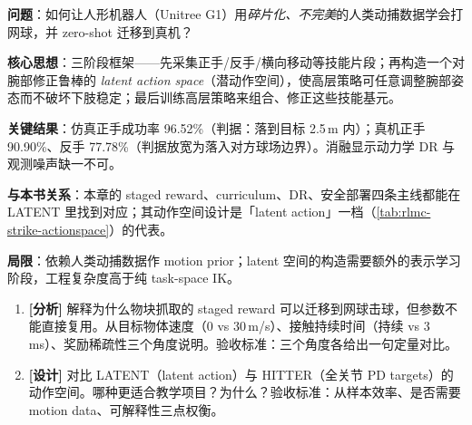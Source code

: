\begin{paper}\label{paper:rlmc-strike-latent}
\textbf{问题}：如何让人形机器人（Unitree G1）用\emph{碎片化、不完美}的人类动捕数据学会打网球，并 zero-shot 迁移到真机？

\textbf{核心思想}：三阶段框架——先采集正手/反手/横向移动等技能片段；再构造一个对腕部修正鲁棒的 \emph{latent action space}（潜动作空间），使高层策略可任意调整腕部姿态而不破坏下肢稳定；最后训练高层策略来组合、修正这些技能基元。

\textbf{关键结果}：仿真正手成功率 96.52\%（判据：落到目标 2.5\,m 内）；真机正手 90.90\%、反手 77.78\%（判据放宽为落入对方球场边界）。消融显示动力学 DR 与观测噪声缺一不可。

\textbf{与本书关系}：本章的 staged reward、curriculum、DR、安全部署四条主线都能在 LATENT 里找到对应；其动作空间设计是「latent action」一档（\cref{tab:rlmc-strike-actionspace}）的代表。

\textbf{局限}：依赖人类动捕数据作 motion prior；latent 空间的构造需要额外的表示学习阶段，工程复杂度高于纯 task-space IK。
\end{paper}


\begin{practice}[本节动手任务]
\begin{enumerate}
  \item \textbf{[分析]} 解释为什么物块抓取的 staged reward 可以迁移到网球击球，但参数不能直接复用。从目标物体速度（0 vs 30\,m/s）、接触持续时间（持续 vs 3\,ms）、奖励稀疏性三个角度说明。验收标准：三个角度各给出一句定量对比。
  \item \textbf{[设计]} 对比 LATENT（latent action）与 HITTER（全关节 PD targets）的动作空间。哪种更适合教学项目？为什么？验收标准：从样本效率、是否需要 motion data、可解释性三点权衡。
\end{enumerate}
\end{practice}

